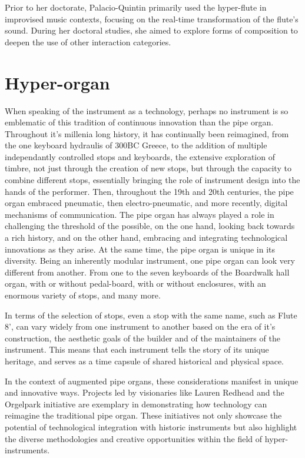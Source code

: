 \documentclass[12pt,twoside,maitrise]{dms_ks}
\theoremstyle{definition}
\begin{document}
Prior to her doctorate, Palacio-Quintin primarily used the hyper-flute in improvised music contexts, focusing on the real-time transformation of the flute’s sound. 
During her doctoral studies, she aimed to explore forms of composition to deepen the use of other interaction categories.

\section{Hyper-organ}

When speaking of the instrument as a technology, perhaps no instrument is so emblematic of this tradition of continuous innovation than the pipe organ. 
Throughout it's millenia long history, it has continually been reimagined, from the one keyboard hydraulis of 300BC Greece, to the addition of multiple independantly controlled stops and keyboards, the extensive exploration of timbre, not just through the creation of new stops, but through the capacity to combine different stops, essentially bringing the role of instrument design into the hands of the performer. 
Then, throughout the 19th and 20th centuries, the pipe organ embraced pneumatic, then electro-pneumatic, and more recently, digital mechanisms of communication. 
The pipe organ has always played a role in challenging the threshold of the possible, on the one hand, looking back towards a rich history, and on the other hand, embracing and integrating technological innovations as they arise. 
At the same time, the pipe organ is unique in its diversity. 
Being an inherently modular instrument, one pipe organ can look very different from another. 
From one to the seven keyboards of the Boardwalk hall organ, with or without pedal-board, with or without enclosures, with an enormous variety of stops, and many more. 

In terms of the selection of stops, even a stop with the same name, such as Flute 8', can vary widely from one instrument to another based on the era of it's construction, the aesthetic goals of the builder and of the maintainers of the instrument. 
This means that each instrument tells the story of its unique heritage, and serves as a time capsule of shared historical and physical space.

In the context of augmented pipe organs, these considerations manifest in unique and innovative ways.
Projects led by visionaries like Lauren Redhead and the Orgelpark initiative are exemplary in demonstrating how technology can reimagine the traditional pipe organ.
These initiatives not only showcase the potential of technological integration with historic instruments but also highlight the diverse methodologies and creative opportunities within the field of hyper-instruments.
\end{document}
